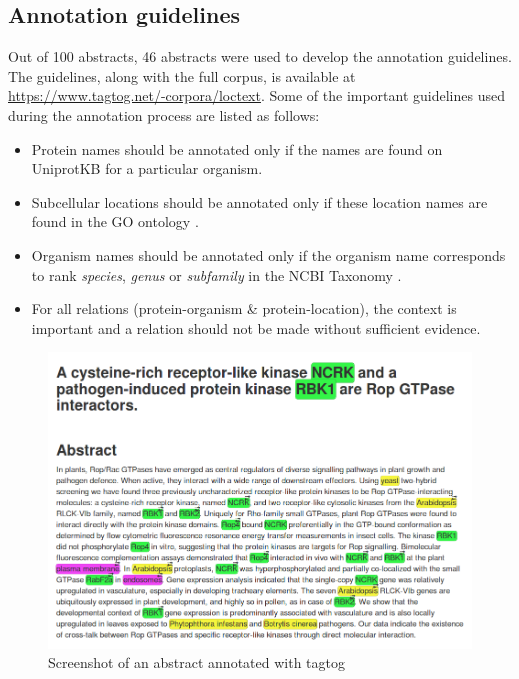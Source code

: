 \subsection*{Annotation guidelines}

Out of 100 abstracts, 46 abstracts were used to develop the annotation guidelines. The guidelines, along with the full corpus, is available at \url{https://www.tagtog.net/-corpora/loctext}. Some of the important guidelines used during the annotation process are listed as follows:

\begin{itemize}

\item Protein names should be annotated only if the names are found on UniprotKB \cite{magrane2011uniprot} for a particular organism.

\item Subcellular locations should be annotated only if these location names are found in the GO ontology \cite{ashburner2000gene}.

\item Organism names should be annotated only if the organism name corresponds to rank \textit{species}, \textit{genus} or \textit{subfamily} in the NCBI Taxonomy \cite{ncbiTaxonomy}.

\item For all relations (protein-organism \& protein-location), the context is important and a relation should not be made without sufficient evidence.

\end{itemize}


\begin{figure}
\centering
\includegraphics[scale=0.4]{figures/tagtog_screenshot.png}
\caption{Screenshot of an abstract annotated with tagtog}\label{fig:tagtogScreenshot}
\end{figure}

